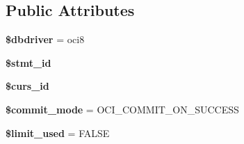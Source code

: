 \subsection*{Public Attributes}
\begin{DoxyCompactItemize}
\item 
\mbox{\label{class_c_i___d_b__oci8__driver_a753bc492edc8a56c4427624bd3667f7e}} 
{\bfseries \$dbdriver} = \textquotesingle{}oci8\textquotesingle{}
\item 
\mbox{\label{class_c_i___d_b__oci8__driver_a36e8911939f22e9c0f0fb18b2364f446}} 
{\bfseries \$stmt\+\_\+id}
\item 
\mbox{\label{class_c_i___d_b__oci8__driver_af3d4fb40345148c3175116a78bb27508}} 
{\bfseries \$curs\+\_\+id}
\item 
\mbox{\label{class_c_i___d_b__oci8__driver_a0763603a2f69b9e15c2635c3bc96d11b}} 
{\bfseries \$commit\+\_\+mode} = O\+C\+I\+\_\+\+C\+O\+M\+M\+I\+T\+\_\+\+O\+N\+\_\+\+S\+U\+C\+C\+E\+SS
\item 
\mbox{\label{class_c_i___d_b__oci8__driver_a9ab6a292a5f8c1f515c1f648ec26baeb}} 
{\bfseries \$limit\+\_\+used} = F\+A\+L\+SE
\end{DoxyCompactItemize}
